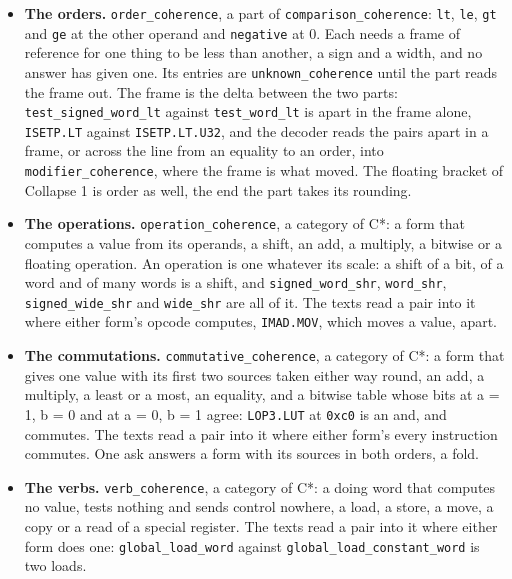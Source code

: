 \begin{itemize}
\item \textbf{The orders.} \texttt{order\_\allowbreak{}coherence}, a part of \texttt{comparison\_\allowbreak{}coherence}: \texttt{lt}, \texttt{le}, \texttt{gt} and \texttt{ge} at the other operand and \texttt{negative} at 0. Each needs a frame of reference for one thing to be less than another, a sign and a width, and no answer has given one. Its entries are \texttt{unknown\_\allowbreak{}coherence} until the part reads the frame out. The frame is the delta between the two parts: \texttt{test\_\allowbreak{}signed\_\allowbreak{}word\_\allowbreak{}lt} against \texttt{test\_\allowbreak{}word\_\allowbreak{}lt} is apart in the frame alone, \texttt{ISETP.\allowbreak{}LT} against \texttt{ISETP.\allowbreak{}LT.\allowbreak{}U32}, and the decoder reads the pairs apart in a frame, or across the line from an equality to an order, into \texttt{modifier\_\allowbreak{}coherence}, where the frame is what moved. The floating bracket of Collapse 1 is order as well, the end the part takes its rounding.
\item \textbf{The operations.} \texttt{operation\_\allowbreak{}coherence}, a category of C*: a form that computes a value from its operands, a shift, an add, a multiply, a bitwise or a floating operation. An operation is one whatever its scale: a shift of a bit, of a word and of many words is a shift, and \texttt{signed\_\allowbreak{}word\_\allowbreak{}shr}, \texttt{word\_\allowbreak{}shr}, \texttt{signed\_\allowbreak{}wide\_\allowbreak{}shr} and \texttt{wide\_\allowbreak{}shr} are all of it. The texts read a pair into it where either form's opcode computes, \texttt{IMAD.\allowbreak{}MOV}, which moves a value, apart.
\item \textbf{The commutations.} \texttt{commutative\_\allowbreak{}coherence}, a category of C*: a form that gives one value with its first two sources taken either way round, an add, a multiply, a least or a most, an equality, and a bitwise table whose bits at a = 1, b = 0 and at a = 0, b = 1 agree: \texttt{LOP3.\allowbreak{}LUT} at \texttt{0xc0} is an and, and commutes. The texts read a pair into it where either form's every instruction commutes. One ask answers a form with its sources in both orders, a fold.
\item \textbf{The verbs.} \texttt{verb\_\allowbreak{}coherence}, a category of C*: a doing word that computes no value, tests nothing and sends control nowhere, a load, a store, a move, a copy or a read of a special register. The texts read a pair into it where either form does one: \texttt{global\_\allowbreak{}load\_\allowbreak{}word} against \texttt{global\_\allowbreak{}load\_\allowbreak{}constant\_\allowbreak{}word} is two loads.

\end{itemize}

